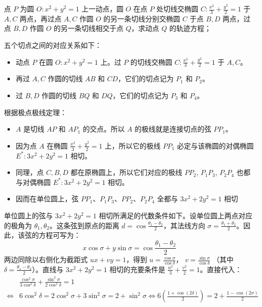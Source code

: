 \begin{exercise}
点 $P$ 为圆 $O: x^2 + y^2 = 1$ 上一动点，圆 $O$ 在点 $P$ 处切线交椭圆 $C: \frac{x^2}{3} + \frac{y^2}{2} = 1$ 于 $A, C$ 两点，再过点 $A, C$ 作圆 $O$ 的另一条切线分别交椭圆 $C$ 于点 $B, D$ 两点，过点 $B, D$ 作圆 $O$ 的另一条切线相交于点 $Q$，求动点 $Q$ 的轨迹方程；
\end{exercise}
\begin{solution}
五个切点之间的对应关系如下：
\begin{itemize}
\item 动点 $P$ 在圆 $O: x^2 + y^2 = 1$ 上。过 $P$ 的切线交椭圆 $C: \frac{x^2}{3} + \frac{y^2}{2} = 1$ 于 $A, C$。
\item 再过 $A, C$ 作圆的切线 $AB$ 和 $CD$，它们的切点记为 $P_1$ 和 $P_2$。
\item 过 $B, D$ 作圆的切线 $BQ$ 和 $DQ$，它们的切点记为 $P_3$ 和 $P_4$。
\end{itemize}
根据极点极线定理：
\begin{itemize}
\item $A$ 是切线 $AP$ 和 $AP_1$ 的交点。所以 $A$ 的极线就是连接切点的弦 $P P_1$。
\item 因为点 $A$ 在椭圆 $\frac{x^2}{3} + \frac{y^2}{2} = 1$ 上，所以它的极线 $P P_1$ 必定与该椭圆的对偶椭圆 $E^*: 3x^2 + 2y^2 = 1$ 相切。
\item 同理，点 $C, B, D$ 都在原椭圆上，所以它们对应的极线 $P P_2$, $P_1 P_3$, $P_2 P_4$ 也都与对偶椭圆 $E^*: 3x^2 + 2y^2 = 1$ 相切。
\item 因而在单位圆上，弦 $P P_1$、$P_1 P_3$、$P P_2$、$P_2 P_4$ 全都与 $3x^2 + 2y^2 = 1$ 相切
\end{itemize}
单位圆上的弦与 $3x^2 + 2y^2 = 1$ 相切所满足的代数条件如下。设单位圆上两点对应的极角为 $\theta_1, \theta_2$。这条弦到原点的距离 $d = \cos\frac{\theta_1 - \theta_2}{2}$，其法线方向 $\sigma = \frac{\theta_1 + \theta_2}{2}$。因此，该弦的方程可写为：
\[x \cos\sigma + y \sin\sigma = \cos\frac{\theta_1 - \theta_2}{2}\]
两边同除以右侧化为截距式 $ux + vy = 1$，得到 $u = \frac{\cos\sigma}{\cos\delta}$， $v = \frac{\sin\sigma}{\cos\delta}$ （其中 $\delta = \frac{\theta_1 - \theta_2}{2}$）。直线与 $3x^2 + 2y^2 = 1$ 相切的充要条件是 $\frac{u^2}{3} + \frac{v^2}{2} = 1$。直接代入：
\begin{align*}
&\frac{\cos^2\sigma}{3\cos^2\delta} + \frac{\sin^2\sigma}{2\cos^2\delta} = 1\\
\Leftrightarrow & 6\cos^2\delta = 2\cos^2\sigma + 3\sin^2\sigma = 2 + \sin^2\sigma\Leftrightarrow  6 \left( \frac{1 + \cos(2\delta)}{2} \right) = 2 + \frac{1 - \cos(2\sigma)}{2}\\

\end{align*}
\end{solution}
